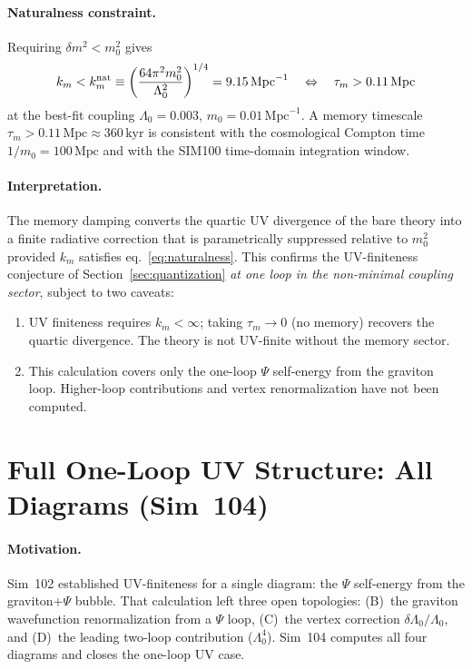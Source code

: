 \documentclass[12pt,a4paper]{article}
\begin{document}
\paragraph{Naturalness constraint.}
Requiring $\delta m^2 < m_0^2$ gives
\begin{equation}
k_m < k_m^{\rm nat} \equiv \left(\frac{64\pi^2 m_0^2}{\Lambda_0^2}\right)^{1/4}
= 9.15\,\mathrm{Mpc}^{-1}
\quad\Leftrightarrow\quad
\tau_m > 0.11\,\mathrm{Mpc}
\label{eq:naturalness}
\end{equation}
at the best-fit coupling $\Lambda_0 = 0.003$, $m_0 = 0.01\,\mathrm{Mpc}^{-1}$.
A memory timescale $\tau_m > 0.11\,\mathrm{Mpc} \approx 360\,\mathrm{kyr}$
is consistent with the cosmological Compton time $1/m_0 = 100\,\mathrm{Mpc}$
and with the SIM100 time-domain integration window.

\paragraph{Interpretation.}
The memory damping converts the quartic UV divergence of the bare theory
into a finite radiative correction that is parametrically suppressed
relative to $m_0^2$ provided $k_m$ satisfies eq.~\eqref{eq:naturalness}.
This confirms the UV-finiteness conjecture of Section~\ref{sec:quantization}
\emph{at one loop in the non-minimal coupling sector}, subject to two caveats:
\begin{enumerate}
  \item UV finiteness requires $k_m < \infty$; taking $\tau_m \to 0$
        (no memory) recovers the quartic divergence. The theory is not
        UV-finite without the memory sector.
  \item This calculation covers only the one-loop $\Psi$ self-energy
        from the graviton loop. Higher-loop contributions and
        vertex renormalization have not been computed.
\end{enumerate}

\section{Full One-Loop UV Structure: All Diagrams (Sim~104)}
\label{sec:sim104}

\paragraph{Motivation.}
Sim~102 established UV-finiteness for a single diagram: the $\Psi$ self-energy
from the graviton+$\Psi$ bubble.  That calculation left three open topologies:
(B)~the graviton wavefunction renormalization from a $\Psi$ loop,
(C)~the vertex correction $\delta\Lambda_0/\Lambda_0$, and
(D)~the leading two-loop contribution ($\Lambda_0^4$).
Sim~104 computes all four diagrams and closes the one-loop UV case.
\end{document}
